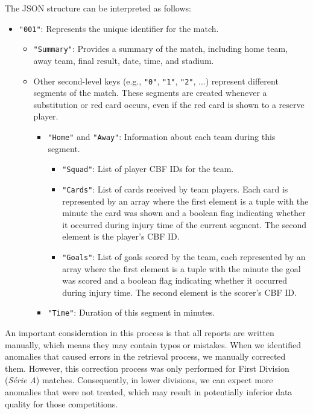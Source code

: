 The JSON structure can be interpreted as follows:
\begin{itemize}
    \item \texttt{"001"}: Represents the unique identifier for the match.
    \begin{itemize}
        \item \texttt{"Summary"}: Provides a summary of the match, including home team, away team, final result, date, time, and stadium.
        \item Other second-level keys (e.g., \texttt{"0"}, \texttt{"1"}, \texttt{"2"}, ...) represent different segments of the match.
        These segments are created whenever a substitution or red card occurs, even if the red card is shown to a reserve player.
        \begin{itemize}
            \item \texttt{"Home"} and \texttt{"Away"}: Information about each team during this segment.
            \begin{itemize}
                \item \texttt{"Squad"}: List of player CBF IDs for the team.
                \item \texttt{"Cards"}: List of cards received by team players.
                Each card is represented by an array where the first element is a tuple with the minute the card was shown and a boolean flag indicating whether it occurred during injury time of the current segment.
                The second element is the player's CBF ID.
                \item \texttt{"Goals"}: List of goals scored by the team, each represented by an array where the first element is a tuple with the minute the goal was scored and a boolean flag indicating whether it occurred during injury time.
                The second element is the scorer's CBF ID.
            \end{itemize}
            \item \texttt{"Time"}: Duration of this segment in minutes.
        \end{itemize}
    \end{itemize}
\end{itemize}

An important consideration in this process is that all reports are written manually, which means they may contain typos or mistakes.
When we identified anomalies that caused errors in the retrieval process, we manually corrected them.
However, this correction process was only performed for First Division (\textit{Série A}) matches.
Consequently, in lower divisions, we can expect more anomalies that were not treated, which may result in potentially inferior data quality for those competitions.
